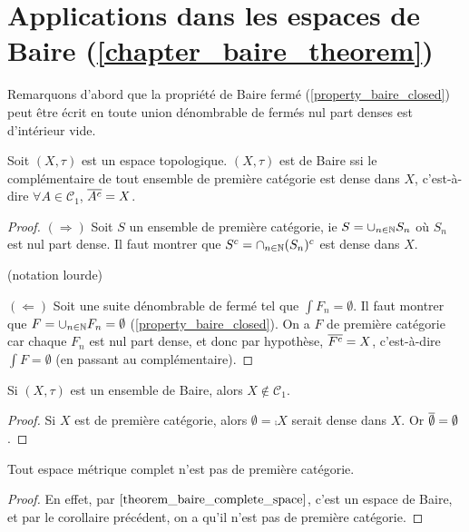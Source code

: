 \section{Applications dans les espaces de Baire (\ref{chapter_baire_theorem})}

Remarquons d'abord que la propriété de Baire fermé
(\ref{property_baire_closed}) peut être écrit en toute union dénombrable
de fermés nul part denses est d'intérieur vide.

\begin{proposition}
	\label{proposition_first_set_category_equiv_baire}
	Soit $(X, \tau)$ est un espace topologique.
	$(X, \tau)$ est de Baire ssi le complémentaire de tout ensemble de première
	catégorie est dense dans $X$, c'est-à-dire $\forall A \in \mathcal{C}_{1}$,
	$\overline{A^{c}} = X$.
\end{proposition}

\begin{proof}
	$(\Rightarrow)$
	Soit $S$ un ensemble de première catégorie, ie $S = \cup_{n \in \mathbb{N}}
	S_{n}$ où $S_{n}$ est nul part dense. Il faut montrer que $S^{c} =
	\cap_{n \in \mathbb{N}} (S_{n})^{c}$ est dense dans $X$.

	(notation lourde)

	$(\Leftarrow)$
	Soit  une suite dénombrable de fermé tel que
	$\int{F_{n}} = \emptyset$.
	Il faut montrer que $F = \cup_{n \in \mathbb{N}} F_{n} = \emptyset$
	(\ref{property_baire_closed}).
	On a $F$ de première catégorie car chaque $F_{n}$ est nul part dense, et
	donc par hypothèse, $\overline{F^{c}} = X$, c'est-à-dire $\int{F} =
	\emptyset$ (en passant au complémentaire).
\end{proof}

\begin{corollary}
	Si $(X, \tau)$ est un ensemble de Baire, alors $X \notin \mathcal{C}_{1}$.
\end{corollary}

\begin{proof}
	Si $X$ est de première catégorie, alors $\emptyset = \comp{X}$ serait dense
	dans $X$. Or $\overline{\emptyset} = \emptyset$.
\end{proof}

\begin{corollary}
	Tout espace métrique complet n'est pas de première catégorie.
\end{corollary}

\begin{proof}
	En effet, par $\ref{theorem_baire_complete_space}$, c'est un espace de
	Baire, et par le corollaire précédent, on a qu'il n'est pas de première catégorie.
\end{proof}

